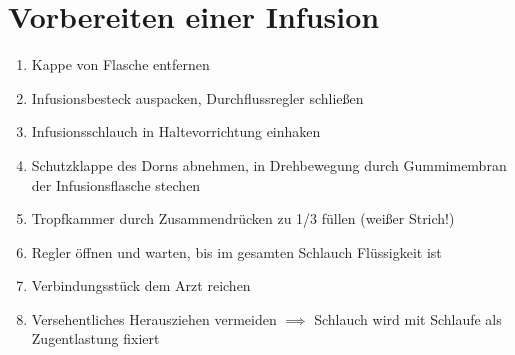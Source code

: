 \chapter{Vorbereiten einer Infusion}
\begin{enumerate}
    \item Kappe von Flasche entfernen
    \item Infusionsbesteck auspacken, Durchflussregler schließen
    \item Infusionsschlauch in Haltevorrichtung einhaken
    \item Schutzklappe des Dorns abnehmen, in Drehbewegung durch Gummimembran der Infusionsflasche stechen
    \item Tropfkammer durch Zusammendrücken zu 1/3 füllen (weißer Strich!)
    \item Regler öffnen und warten, bis im gesamten Schlauch Flüssigkeit ist
    \item Verbindungsstück dem Arzt reichen
    \item Versehentliches Herausziehen vermeiden $\implies$ Schlauch wird mit Schlaufe als Zugentlastung fixiert
\end{enumerate}
